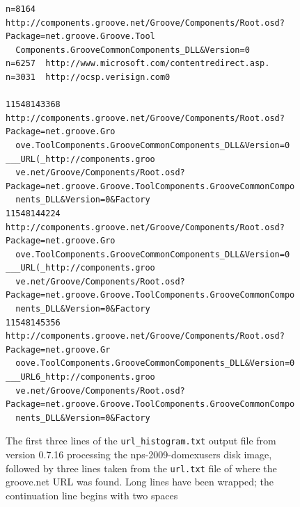 \begin{figure}
\begin{Verbatim}[fontsize=\footnotesize]
n=8164  http://components.groove.net/Groove/Components/Root.osd?Package=net.groove.Groove.Tool
  Components.GrooveCommonComponents_DLL&Version=0
n=6257  http://www.microsoft.com/contentredirect.asp.
n=3031  http://ocsp.verisign.com0

11548143368     http://components.groove.net/Groove/Components/Root.osd?Package=net.groove.Gro
  ove.ToolComponents.GrooveCommonComponents_DLL&Version=0       ___URL(_http://components.groo
  ve.net/Groove/Components/Root.osd?Package=net.groove.Groove.ToolComponents.GrooveCommonCompo
  nents_DLL&Version=0&Factory
11548144224     http://components.groove.net/Groove/Components/Root.osd?Package=net.groove.Gro
  ove.ToolComponents.GrooveCommonComponents_DLL&Version=0       ___URL(_http://components.groo
  ve.net/Groove/Components/Root.osd?Package=net.groove.Groove.ToolComponents.GrooveCommonCompo
  nents_DLL&Version=0&Factory
11548145356      http://components.groove.net/Groove/Components/Root.osd?Package=net.groove.Gr
  oove.ToolComponents.GrooveCommonComponents_DLL&Version=0      ___URL6_http://components.groo
  ve.net/Groove/Components/Root.osd?Package=net.groove.Groove.ToolComponents.GrooveCommonCompo
  nents_DLL&Version=0&Factory
\end{Verbatim}
\caption{The first three lines of the \texttt{url\_histogram.txt}
  output file from \be version 0.7.16 processing the
  nps-2009-domexusers disk image, followed by three lines taken from
  the \texttt{url.txt} file of where the groove.net URL was
  found. Long lines have been wrapped; the continuation line begins
  with two spaces}\label{url_histogram-0.7.16}
\end{figure}

